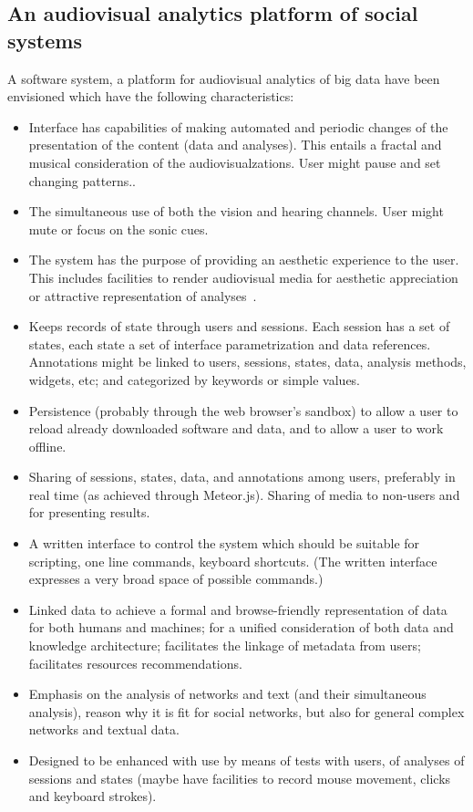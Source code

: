\documentclass[letterpaper,10pt]{article}
\begin{document}
\subsection{An audiovisual analytics platform of social systems}
A software system, a platform for audiovisual analytics of big data
have been envisioned which have the following characteristics:
\begin{itemize}
  \item Interface has capabilities of making automated and periodic changes of
	  the presentation of the content (data and analyses).
		This entails a fractal and musical consideration
		of the audiovisualzations.
		User might pause and set changing patterns..
  \item The simultaneous use of both the vision and hearing channels.
	  User might mute or focus on the sonic cues.
  \item The system has the purpose of providing an aesthetic experience
	  to the user.
		This includes facilities to render audiovisual media
		for aesthetic appreciation or attractive representation of
		analyses~\cite{tufte}.
  \item Keeps records of state through users and sessions.
	  Each session has a set of states, each state a set
		of interface parametrization and data references.
	Annotations might be linked to users, sessions, states, data,
		analysis methods, widgets, etc; and categorized
		by keywords or simple values.
  \item Persistence (probably through the web browser's sandbox)
	  to allow a user to reload already downloaded software
		and data,
		and to allow a user to work offline.
  \item Sharing of sessions, states, data, and annotations among users,
	  preferably in real time (as achieved through Meteor.js).
		Sharing of media to non-users and for presenting results.
  \item A written interface to control the system which should be
	  suitable for scripting, one line commands, keyboard shortcuts.
		(The written interface expresses a very broad space
		of possible commands.)
  \item Linked data to achieve a formal and browse-friendly representation of data for both humans and machines;
	  for a unified consideration of both data and knowledge architecture;
facilitates the linkage of metadata from users;
facilitates resources recommendations.
  \item Emphasis on the analysis of networks and text (and their simultaneous analysis),
	  reason why it is fit for social networks, but also for general complex networks
		and textual data.
  \item Designed to be enhanced with use by means of tests with users, of analyses of sessions and states
	  (maybe have facilities to record mouse movement, clicks and keyboard strokes).
\end{itemize}
\end{document}
